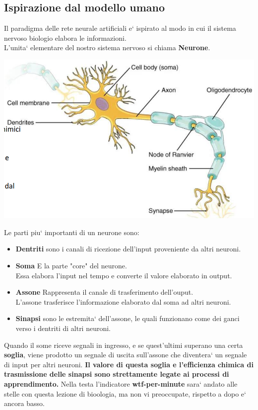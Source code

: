 \subsection{Ispirazione dal modello umano}
Il paradigma delle rete neurale artificiali e` ispirato al modo in cui il sistema 
%
nervoso biologio elabora le informazioni.
\\
L'unita` elementare del nostro sistema nervoso si chiama \textbf{Neurone}.
\begin{center}
    \includegraphics[scale=0.5]{images/Neurone.png}
\end{center}
Le parti piu` importanti di un neurone sono:
\begin{itemize}
    \item \textbf{Dentriti} sono i canali di ricezione dell'input proveniente 
%
    da altri neuroni.
    \item \textbf{Soma} E la parte "core" del neurone.
\\
    Essa elabora l'input nel tempo e converte il valore elaborato in output.
    \item \textbf{Assone} Rappresenta il canale di trasferimento dell'ouput.
\\
    L'assone trasferisce l'informazione elaborato dal soma ad altri neuroni.
    \item \textbf{Sinapsi} sono le estremita` dell'assone, le quali funzionano 
%
    come dei ganci verso i dentriti di altri neuroni.
\end{itemize}
Quando il some riceve segnali in ingresso, e se quest'ultimi superano una certa 
%
\textbf{soglia}, viene prodotto un segnale di uscita sull'assone che diventera`
%
un segnale di input per altri neuroni.
\textbf{Il valore di questa soglia e l'efficienza chimica di trasmissione delle 
%
sinapsi sono strettamente legate ai processi di apprendimento.}
Nella testa l'indicatore \textbf{wtf-per-minute} sara` andato alle stelle con
%
questa lezione di bioologia, ma non vi preoccupate, rispetto a dopo e` ancora basso.
\newpage
